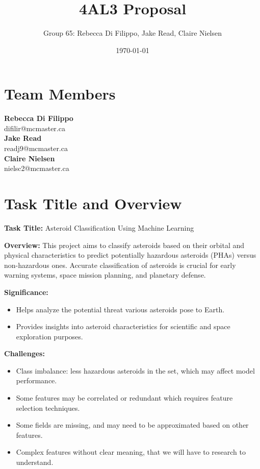 \documentclass[12pt]{article}
\title{4AL3 Proposal}
\author{Group 65: Rebecca Di Filippo, Jake Read, Claire Nielsen}
\date{\today}
\begin{document}
\maketitle

\newpage
\section{Team Members}

\textbf{Rebecca Di Filippo}\\
difilir@mcmaster.ca\\

\textbf{Jake Read}\\
readj9@mcmaster.ca\\

\textbf{Claire Nielsen}\\
nielsc2@mcmaster.ca\\

\section{Task Title and Overview}
\textbf{Task Title:} Asteroid Classification Using Machine Learning \newline

\textbf{Overview:} 
This project aims to classify asteroids based on their orbital and physical characteristics to predict potentially hazardous asteroids (PHAs) versus non-hazardous ones. 
Accurate classification of asteroids is crucial for early warning systems, space mission planning, and planetary defense. \newline

\textbf{Significance:}
\begin{itemize}
    \item Helps analyze the potential threat various asteroids pose to Earth.
    \item Provides insights into asteroid characteristics for scientific and space exploration purposes.
\end{itemize}

\textbf{Challenges:}
\begin{itemize}
    \item Class imbalance: less hazardous asteroids in the set, which may affect model performance.
    \item Some features may be correlated or redundant which requires feature selection techniques.
    \item Some fields are missing, and may need to be approximated based on other features.
    \item Complex features without clear meaning, that we will have to research to understand.
\end{itemize}
\end{document}
